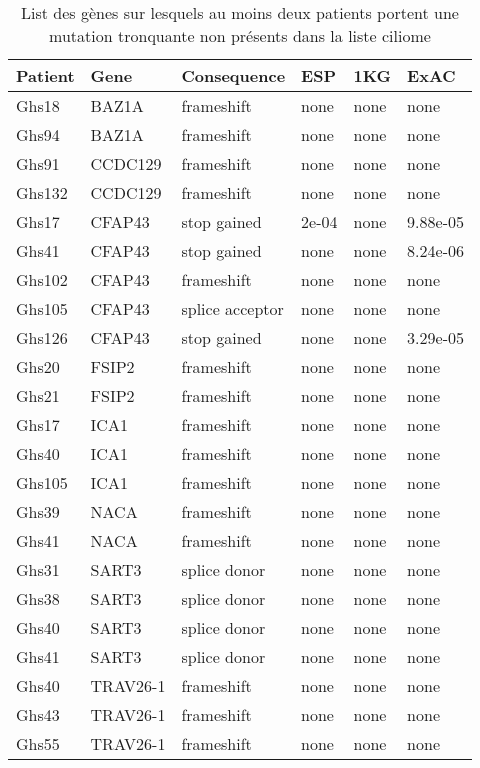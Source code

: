 \documentclass[12pt,twoside]{reedthesis}
\theoremstyle{definition}
\theoremstyle{definition}
\theoremstyle{remark}
\begin{document}
  \newpage  
  
  \begin{longtable}[t]{llllll}
  \caption{\label{tab:tabgrp2high}List des gènes sur lesquels au moins deux patients portent une mutation tronquante non présents dans la liste ciliome }\\
  \toprule
  Patient & Gene & Consequence & ESP & 1KG & ExAC\\
  \midrule
  Ghs18 & BAZ1A & frameshift & none & none & none\\
  Ghs94 & BAZ1A & frameshift & none & none & none\\
  Ghs91 & CCDC129 & frameshift & none & none & none\\
  Ghs132 & CCDC129 & frameshift & none & none & none\\
  Ghs17 & CFAP43 & stop gained & 2e-04 & none & 9.88e-05\\
  \addlinespace
  Ghs41 & CFAP43 & stop gained & none & none & 8.24e-06\\
  Ghs102 & CFAP43 & frameshift & none & none & none\\
  Ghs105 & CFAP43 & splice acceptor & none & none & none\\
  Ghs126 & CFAP43 & stop gained & none & none & 3.29e-05\\
  Ghs20 & FSIP2 & frameshift & none & none & none\\
  \addlinespace
  Ghs21 & FSIP2 & frameshift & none & none & none\\
  Ghs17 & ICA1 & frameshift & none & none & none\\
  Ghs40 & ICA1 & frameshift & none & none & none\\
  Ghs105 & ICA1 & frameshift & none & none & none\\
  Ghs39 & NACA & frameshift & none & none & none\\
  \addlinespace
  Ghs41 & NACA & frameshift & none & none & none\\
  Ghs31 & SART3 & splice donor & none & none & none\\
  Ghs38 & SART3 & splice donor & none & none & none\\
  Ghs40 & SART3 & splice donor & none & none & none\\
  Ghs41 & SART3 & splice donor & none & none & none\\
  \addlinespace
  Ghs40 & TRAV26-1 & frameshift & none & none & none\\
  Ghs43 & TRAV26-1 & frameshift & none & none & none\\
  Ghs55 & TRAV26-1 & frameshift & none & none & none\\
  \bottomrule
  \end{longtable}
  
\end{document}
